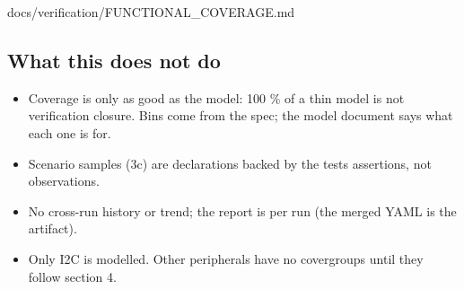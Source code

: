 \begin{relocated}{docs/verification/FUNCTIONAL_COVERAGE.md}
\subsection{What this does not do}\label{tm:flow:functional-coverage:5-what-this-does-not-do}

\begin{itemize}
\tightlist
\item
  Coverage is only as good as the model: 100 \% of a thin model is not
  verification closure. Bins come from the spec; the model document says
  what each one is for.
\item
  Scenario samples (3c) are declarations backed by the
  test\textquotesingle s assertions, not observations.
\item
  No cross-run history or trend; the report is per run (the merged YAML
  is the artifact).
\item
  Only I2C is modelled. Other peripherals have no covergroups until they
  follow section 4.
\end{itemize}
\end{relocated}

